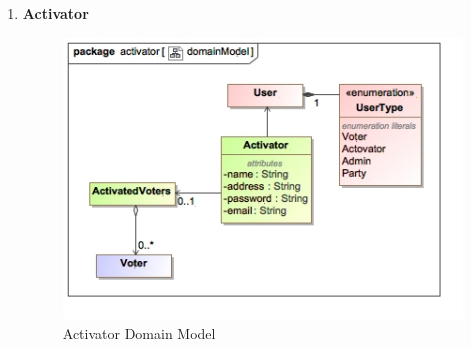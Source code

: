 \begin{enumerate}
			\newpage
			
			\item \textbf{Activator}
			\begin{figure}[H]
				\centering
				\includegraphics[width=0.75\linewidth]{../Images/DomainModels/activator_domainModel.png}
				\caption{Activator Domain Model}
			\end{figure}
\end{enumerate}